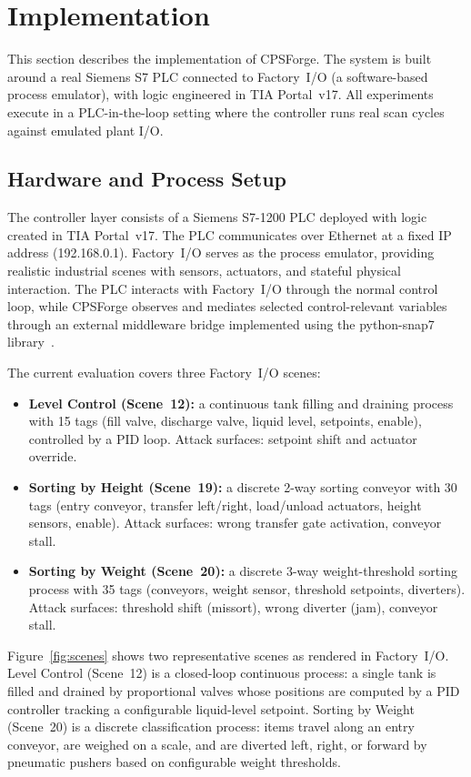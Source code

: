 \section{Implementation}
\label{sec:implementation}

This section describes the implementation of CPSForge. The system is built around a real Siemens S7 PLC connected to Factory~I/O (a software-based process emulator), with logic engineered in TIA Portal~v17. All experiments execute in a PLC-in-the-loop setting where the controller runs real scan cycles against emulated plant I/O.

\subsection{Hardware and Process Setup}

The controller layer consists of a Siemens S7-1200 PLC deployed with logic created in TIA Portal~v17. The PLC communicates over Ethernet at a fixed IP address (192.168.0.1). Factory~I/O serves as the process emulator, providing realistic industrial scenes with sensors, actuators, and stateful physical interaction. The PLC interacts with Factory~I/O through the normal control loop, while CPSForge observes and mediates selected control-relevant variables through an external middleware bridge implemented using the python-snap7 library~\cite{snap7}.

The current evaluation covers three Factory~I/O scenes:

\begin{itemize}[leftmargin=1.5em]
    \item \textbf{Level Control (Scene~12):} a continuous tank filling and draining process with 15 tags (fill valve, discharge valve, liquid level, setpoints, enable), controlled by a PID loop. Attack surfaces: setpoint shift and actuator override.
    \item \textbf{Sorting by Height (Scene~19):} a discrete 2-way sorting conveyor with 30 tags (entry conveyor, transfer left/right, load/unload actuators, height sensors, enable). Attack surfaces: wrong transfer gate activation, conveyor stall.
    \item \textbf{Sorting by Weight (Scene~20):} a discrete 3-way weight-threshold sorting process with 35 tags (conveyors, weight sensor, threshold setpoints, diverters). Attack surfaces: threshold shift (missort), wrong diverter (jam), conveyor stall.
\end{itemize}

Figure~\ref{fig:scenes} shows two representative scenes as rendered in Factory~I/O. Level Control (Scene~12) is a closed-loop continuous process: a single tank is filled and drained by proportional valves whose positions are computed by a PID controller tracking a configurable liquid-level setpoint. Sorting by Weight (Scene~20) is a discrete classification process: items travel along an entry conveyor, are weighed on a scale, and are diverted left, right, or forward by pneumatic pushers based on configurable weight thresholds.

